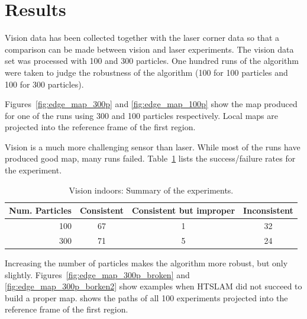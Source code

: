 \section{Results}

Vision data has been collected together with the laser corner data so
that a comparison can be made between vision and laser
experiments. The vision data set was processed with 100 and 300
particles. One hundred runs of the algorithm were taken to judge the
robustness of the algorithm (100 for 100 particles and 100 for 300
particles).

Figures~\ref{fig:edge_map_300p} and \ref{fig:edge_map_100p} show the
map produced for one of the runs using 300 and 100 particles
respectively. Local maps are projected into the reference frame of the
first region. 

Vision is a much more challenging sensor than laser. While most of the
runs have produced good map, many runs
failed. Table~\ref{tab:results_vision} lists the success/failure rates
for the experiment.

\begin{table}[ht]
\center
\begin{tabular}{r|c|c|c}
Num. Particles & Consistent & Consistent but improper & Inconsistent\\
\hline
100 & 67 & 1 & 32\\
300 & 71 & 5 & 24\\
\end{tabular}
\caption{Vision indoors: Summary of the experiments.}
\label{tab:results_vision}
\end{table}

Increasing the number of particles makes the algorithm more robust,
but only slightly. Figures~\ref{fig:edge_map_300p_broken} and
\ref{fig:edge_map_300p_borken2} show examples when HTSLAM did not
succeed to build a proper map.  shows the
paths of all 100 experiments projected into the reference frame of the
first region.


